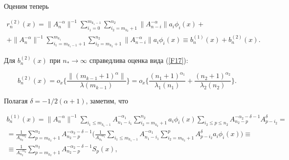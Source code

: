 Оценим теперь


\begin{multline}


\label{F18}


r_n^{(2)}(x)=\| A_n^{-\alpha }\|^{-1} \sum_{i_1=0}^{m_{k_1-1}}


\sum_{i_2=m_{k_2}+1}^{n_2}\|


A_{n-i}^{-\alpha } \| a_i \phi_i (x)+ \\


%


+\| A_n^{-\alpha }\|^{-1} \sum_{i_1=m_{k_1-1}+1}^{m_{k_1}}


\sum_{i_2=m_{k_2}+1}^{n_2}\|


A_{n-i}^{-\alpha }\| a_i \phi_i (x)\equiv b_n^{(1)}(x)+b_n^{(2)}(x).


\end{multline}





Для $b_n^{(2)}(x)$ при $n_* \to \infty $ справедлива оценка вида (\ref{F17}):


\begin{equation}


\label{F19}


b_n^{(2)}(x)=o_x \bigg\{ \frac{\| (m_{k-1}+1)^\alpha \| }{\lambda


(m_{k-1})} \bigg\}=o_x \bigg\{ \frac{(n_1+1)^{\alpha_1}}{\lambda_1(n_1)}+


\frac{(n_2+1)^{\alpha_2}}{\lambda_2(n_2)}\bigg \} .


\end{equation}


Полагая $\delta =-1/2(\alpha +1)$, заметим, что


\begin{multline*}


b_n^{(1)}(x)=\| A_n^{-\alpha }\|^{-1} \sum_{i_1\le


m_{k_1-1}}A_{n_1-i_1}^{-\alpha_1}\sum_{i_2=m_{k_2}+1}^{n_2} a_i\phi_i(x)


\sum_{i_2\le p \le n_2} A_{n_2-p}^{-\alpha_2-\delta -1}


A_{p-i_2}^{\delta} = \\


%


=\frac{1}{A^{-\alpha_2}_{n_2}} \sum_{p=m_{k_2}+1}^{n_2}


A_{n_2-p}^{-\alpha_2-\delta -1} \bigg(\frac{1}{A_{n_1}^{-\alpha_1}}


\sum_{i_1\le m_{k_1-1}}A_{n_1-i_1}^{-\alpha_1}


\sum_{i_2=m_{k_2}+1}^p A_{p-i_2}^\delta a_i \phi_i(x) \bigg) \equiv \\


%


\equiv \frac{1}{A_{n_2}^{-\alpha_2}}


\sum_{p=m_{k_2}+1}^{n_2} A_{n_2-p}^{-\alpha_2-\delta -1}S_p(x),


\end{multline*}


